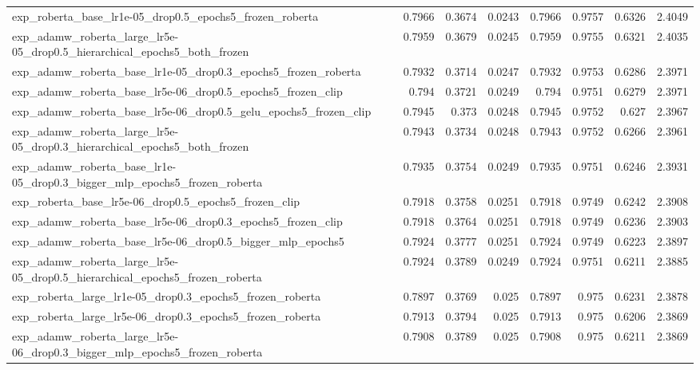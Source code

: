 \documentclass[a4paper,oneside,bibliography=totoc]{scrbook}
\begin{document}
\begin{landscape}
\begin{center}
\begin{longtable}{p{4cm} *{7}{r}}
        exp\_roberta\_base\_lr1e-05\_drop0.5\_epochs5\_frozen\_roberta & 0.7966 & 0.3674 & 0.0243 & 0.7966 & 0.9757 & 0.6326 & 2.4049 \\ 
        exp\_adamw\_roberta\_large\_lr5e-05\_drop0.5\_hierarchical\_epochs5\_both\_frozen & 0.7959 & 0.3679 & 0.0245 & 0.7959 & 0.9755 & 0.6321 & 2.4035 \\ 
        exp\_adamw\_roberta\_base\_lr1e-05\_drop0.3\_epochs5\_frozen\_roberta & 0.7932 & 0.3714 & 0.0247 & 0.7932 & 0.9753 & 0.6286 & 2.3971 \\ 
        exp\_adamw\_roberta\_base\_lr5e-06\_drop0.5\_epochs5\_frozen\_clip & 0.794 & 0.3721 & 0.0249 & 0.794 & 0.9751 & 0.6279 & 2.3971 \\ 
        exp\_adamw\_roberta\_base\_lr5e-06\_drop0.5\_gelu\_epochs5\_frozen\_clip & 0.7945 & 0.373 & 0.0248 & 0.7945 & 0.9752 & 0.627 & 2.3967 \\ 
        exp\_adamw\_roberta\_large\_lr5e-05\_drop0.3\_hierarchical\_epochs5\_both\_frozen & 0.7943 & 0.3734 & 0.0248 & 0.7943 & 0.9752 & 0.6266 & 2.3961 \\ 
        exp\_adamw\_roberta\_base\_lr1e-05\_drop0.3\_bigger\_mlp\_epochs5\_frozen\_roberta & 0.7935 & 0.3754 & 0.0249 & 0.7935 & 0.9751 & 0.6246 & 2.3931 \\ 
        exp\_roberta\_base\_lr5e-06\_drop0.5\_epochs5\_frozen\_clip & 0.7918 & 0.3758 & 0.0251 & 0.7918 & 0.9749 & 0.6242 & 2.3908 \\ 
        exp\_adamw\_roberta\_base\_lr5e-06\_drop0.3\_epochs5\_frozen\_clip & 0.7918 & 0.3764 & 0.0251 & 0.7918 & 0.9749 & 0.6236 & 2.3903 \\ 
        exp\_adamw\_roberta\_base\_lr5e-06\_drop0.5\_bigger\_mlp\_epochs5 & 0.7924 & 0.3777 & 0.0251 & 0.7924 & 0.9749 & 0.6223 & 2.3897 \\ 
        exp\_adamw\_roberta\_large\_lr5e-05\_drop0.5\_hierarchical\_epochs5\_frozen\_roberta & 0.7924 & 0.3789 & 0.0249 & 0.7924 & 0.9751 & 0.6211 & 2.3885 \\ 
        exp\_roberta\_large\_lr1e-05\_drop0.3\_epochs5\_frozen\_roberta & 0.7897 & 0.3769 & 0.025 & 0.7897 & 0.975 & 0.6231 & 2.3878 \\ 
        exp\_roberta\_large\_lr5e-06\_drop0.3\_epochs5\_frozen\_roberta & 0.7913 & 0.3794 & 0.025 & 0.7913 & 0.975 & 0.6206 & 2.3869 \\ 
        exp\_adamw\_roberta\_large\_lr5e-06\_drop0.3\_bigger\_mlp\_epochs5\_frozen\_roberta & 0.7908 & 0.3789 & 0.025 & 0.7908 & 0.975 & 0.6211 & 2.3869 \\ 

\end{longtable}
\end{center}
\end{landscape}
\end{document}
